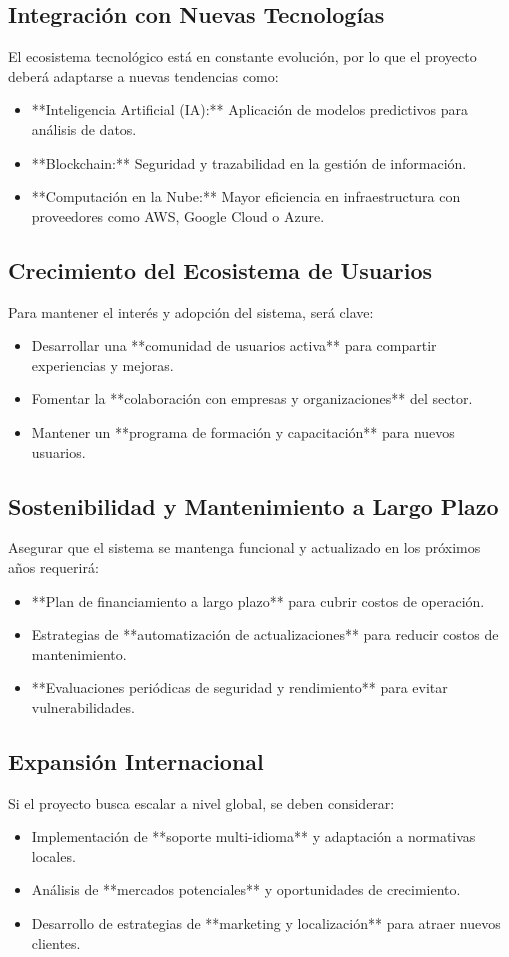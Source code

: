 \subsection{Integración con Nuevas Tecnologías}
El ecosistema tecnológico está en constante evolución, por lo que el proyecto deberá adaptarse a nuevas tendencias como:
\begin{itemize}
	\item **Inteligencia Artificial (IA):** Aplicación de modelos predictivos para análisis de datos.
	\item **Blockchain:** Seguridad y trazabilidad en la gestión de información.
	\item **Computación en la Nube:** Mayor eficiencia en infraestructura con proveedores como AWS, Google Cloud o Azure.
\end{itemize}

\subsection{Crecimiento del Ecosistema de Usuarios}
Para mantener el interés y adopción del sistema, será clave:
\begin{itemize}
	\item Desarrollar una **comunidad de usuarios activa** para compartir experiencias y mejoras.
	\item Fomentar la **colaboración con empresas y organizaciones** del sector.
	\item Mantener un **programa de formación y capacitación** para nuevos usuarios.
\end{itemize}

\subsection{Sostenibilidad y Mantenimiento a Largo Plazo}
Asegurar que el sistema se mantenga funcional y actualizado en los próximos años requerirá:
\begin{itemize}
	\item **Plan de financiamiento a largo plazo** para cubrir costos de operación.
	\item Estrategias de **automatización de actualizaciones** para reducir costos de mantenimiento.
	\item **Evaluaciones periódicas de seguridad y rendimiento** para evitar vulnerabilidades.
\end{itemize}

\subsection{Expansión Internacional}
Si el proyecto busca escalar a nivel global, se deben considerar:
\begin{itemize}
	\item Implementación de **soporte multi-idioma** y adaptación a normativas locales.
	\item Análisis de **mercados potenciales** y oportunidades de crecimiento.
	\item Desarrollo de estrategias de **marketing y localización** para atraer nuevos clientes.
\end{itemize}